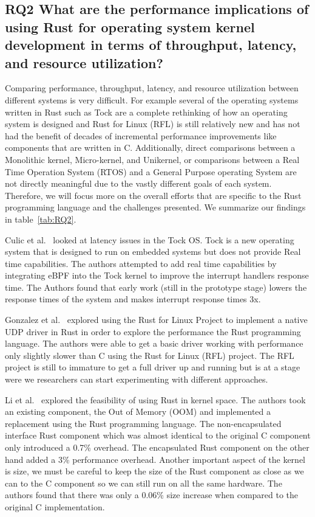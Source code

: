 \documentclass[sigconf]{acmart}
\begin{document}
\subsection{RQ2  What are the performance implications of using Rust for operating system
      kernel development in terms of throughput, latency, and resource utilization?}

Comparing performance, throughput, latency, and resource utilization between different systems is very difficult. For example several of the operating systems written in Rust such as Tock are a complete rethinking of how an operating system is designed and Rust for Linux (RFL) is still relatively new and has not had the benefit of decades of incremental performance improvements like components that are written in C. Additionally, direct comparisons between a Monolithic kernel, Micro-kernel, and Unikernel, or comparisons between a Real Time Operation System (RTOS) and a General Purpose operating System are not directly meaningful due to the vastly different goals of each system. Therefore, we will focus more on the overall efforts that are specific to the Rust programming language and the challenges presented. We summarize our findings in table~\ref{tab:RQ2}.

Culic et al.~\cite{Culic2022-bk} looked at latency issues in the Tock OS. Tock is a new operating
system that is designed to run on embedded systems but does not provide Real time capabilities. The
authors attempted to add real time capabilities by integrating eBPF into the Tock kernel to improve
the interrupt handlers response time. The Authors found that early work (still in the prototype
stage) lowers the response times of the system and makes interrupt response times 3x.

Gonzalez et al.~\cite{Gonzalez2023-ek} explored using the Rust for Linux Project to implement a
native UDP driver in Rust in order to explore the performance the Rust programming language. The
authors were able to get a basic driver working with performance only slightly slower than C using
the Rust for Linux (RFL) project. The RFL project is still to immature to get a full driver up and
running but is at a stage were we researchers can start experimenting with different
approaches.

Li et al.~\cite{Li2024-be} explored the feasibility of using Rust in kernel space. The authors took
an existing component, the Out of Memory (OOM) and implemented a replacement using the Rust
programming language. The non-encapsulated interface Rust component which was almost identical to
the original C component only introduced a 0.7\% overhead. The encapsulated Rust component on the
other hand added a 3\% performance overhead. Another important aspect of the kernel is size, we must
be careful to keep the size of the Rust component as close as we can to the C component so we can
still run on all the same hardware. The authors found that there was only a 0.06\% size increase
when compared to the original C implementation.
\end{document}
